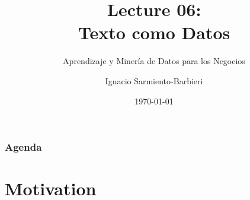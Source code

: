 \documentclass[
  shownotes,
  xcolor={svgnames},
  hyperref={colorlinks,citecolor=DarkBlue,linkcolor=DarkRed,urlcolor=DarkBlue}
  , aspectratio=169]{beamer}
\begin{document}
\title[Lecture 06]{Lecture 06: \\ Texto como Datos}
\subtitle{Aprendizaje y Minería de Datos para los Negocios}
\date{\today}

\author[Sarmiento-Barbieri]{Ignacio Sarmiento-Barbieri}


\begin{frame}[noframenumbering]
\maketitle
\end{frame}





\begin{frame}
\frametitle{Agenda}

\tableofcontents

\end{frame}

\section{Motivation }
\end{document}
